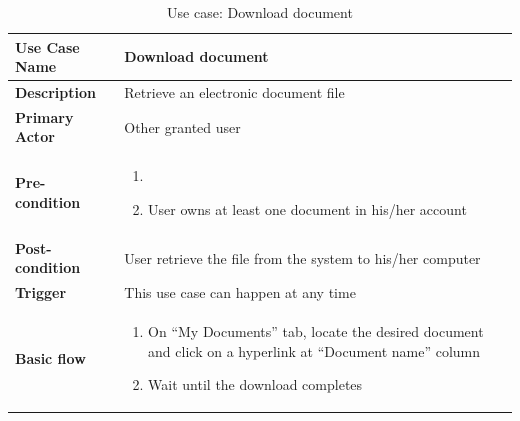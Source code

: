 \begin{table}
	\centering
	\caption{Use case: Download document}
	\label{tbl:usecase-last}
	\begin{tabular}{|l|L{9cm}|}
		\hline
		\textbf{Use Case Name} & Download document \\
		\hline
		
		\textbf{Description} &  Retrieve an electronic document file \\
		\textbf{Primary Actor} & Other granted user \\
		\textbf{Pre-condition} & 
		\begin{enumerate}
			\item \alreadylogin
			\item User owns at least one document in his/her account
		\end{enumerate} \\
		\textbf{Post-condition} & User retrieve the file from the system to his/her computer \\
		\textbf{Trigger} & This use case can happen at any time \\
		\textbf{Basic flow} & 
		\begin{enumerate}
			\item On \enquote{My Documents} tab, locate the desired document and click on a hyperlink at \enquote{Document name} column
			\item Wait until the download completes
		\end{enumerate} \\
		\hline
	\end{tabular}
\end{table}
